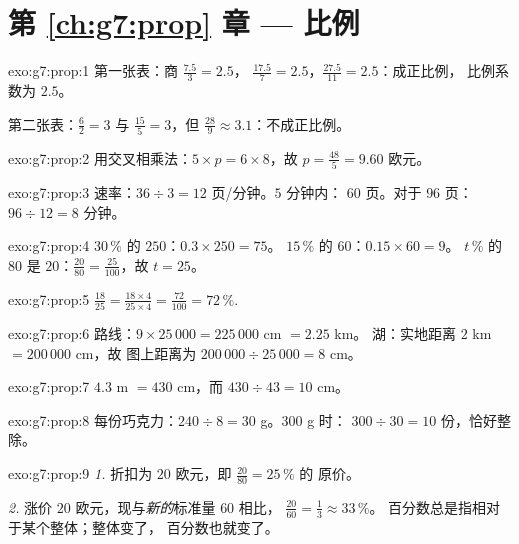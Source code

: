\section*{第 \ref{ch:g7:prop} 章 --- 比例}

\begin{solution}{exo:g7:prop:1}
第一张表：商 $\frac{7.5}{3} = 2.5$，
$\frac{17.5}{7} = 2.5$，$\frac{27.5}{11} = 2.5$：成正比例，
比例系数为 $2.5$。

第二张表：$\frac62 = 3$ 与 $\frac{15}{5} = 3$，但
$\frac{28}{9} \approx 3.1$：不成正比例。
\end{solution}

\begin{solution}{exo:g7:prop:2}
用交叉相乘法：$5 \times p = 6 \times 8$，故
$p = \frac{48}{5} = 9.60$ 欧元。
\end{solution}

\begin{solution}{exo:g7:prop:3}
速率：$36 \div 3 = 12$ 页/分钟。$5$ 分钟内：
$60$ 页。对于 $96$ 页：$96 \div 12 = 8$ 分钟。
\end{solution}

\begin{solution}{exo:g7:prop:4}
$30\,\%$ 的 $250$：$0.3 \times 250 = 75$。\quad
$15\,\%$ 的 $60$：$0.15 \times 60 = 9$。\quad
$t\,\%$ 的 $80$ 是 $20$：$\frac{20}{80} = \frac{25}{100}$，故
$t = 25$。
\end{solution}

\begin{solution}{exo:g7:prop:5}
$\frac{18}{25} = \frac{18 \times 4}{25 \times 4} = \frac{72}{100} =
72\,\%$.
\end{solution}

\begin{solution}{exo:g7:prop:6}
路线：$9 \times 25\,000 = 225\,000$ cm $= 2.25$ km。
湖：实地距离 $2$ km $= 200\,000$ cm，故
图上距离为 $200\,000 \div 25\,000 = 8$ cm。
\end{solution}

\begin{solution}{exo:g7:prop:7}
$4.3$ m $= 430$ cm，而 $430 \div 43 = 10$ cm。
\end{solution}

\begin{solution}{exo:g7:prop:8}
每份巧克力：$240 \div 8 = 30$ g。$300$ g 时：
$300 \div 30 = 10$ 份，恰好整除。
\end{solution}

\begin{solution}{exo:g7:prop:9}
\emph{1.} 折扣为 $20$ 欧元，即 $\frac{20}{80} = 25\,\%$ 的
原价。

\emph{2.} 涨价 $20$ 欧元，现与\emph{新的}标准量 $60$ 相比，
$\frac{20}{60} = \frac13 \approx 33\,\%$。
百分数总是指相对于某个整体；整体变了，
百分数也就变了。
\end{solution}

